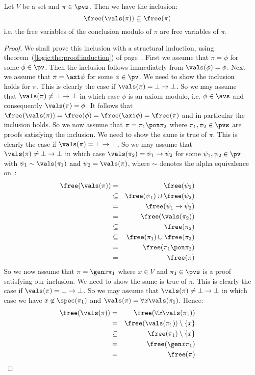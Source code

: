 \begin{prop}\label{logic:prop:FUAP:valuationmod:freevar:conclusion}
Let $V$ be a set and $\pi\in\pvs$. Then we have the inclusion:
    \[
    \free(\vals(\pi))\subseteq\free(\pi)
    \]
i.e. the free variables of the conclusion modulo of $\pi$ are free
variables of $\pi$.
\end{prop}
\begin{proof}
We shall prove this inclusion with a structural induction, using
theorem~(\ref{logic:the:proof:induction}) of
page~\pageref{logic:the:proof:induction}. First we assume that
$\pi=\phi$ for some $\phi\in\pv$. Then the inclusion follows
immediately from $\vals(\phi)=\phi$. Next we assume that
$\pi=\axi\phi$ for some $\phi\in\pv$. We need to show the inclusion
holds for $\pi$. This is clearly the case if
$\vals(\pi)=\bot\to\bot$. So we may assume that
$\vals(\pi)\neq\bot\to\bot$ in which case $\phi$ is an axiom modulo,
i.e. $\phi\in\avs$ and consequently $\vals(\pi)=\phi$. It follows
that $\free(\vals(\pi))=\free(\phi)=\free(\axi\phi)=\free(\pi)$ and
in particular the inclusion holds. So we now assume that
$\pi=\pi_{1}\pon\pi_{2}$ where $\pi_{1},\pi_{2}\in\pvs$ are proofs
satisfying the inclusion. We need to show the same is true of $\pi$.
This is clearly the case if $\vals(\pi)=\bot\to\bot$. So we may
assume that $\vals(\pi)\neq\bot\to\bot$ in which case
$\vals(\pi_{2})=\psi_{1}\to\psi_{2}$ for some
$\psi_{1},\psi_{2}\in\pv$ with $\psi_{1}\sim\vals(\pi_{1})$ and
$\psi_{2}=\vals(\pi)$, where $\sim$ denotes the alpha equivalence
on \pv\,:
    \begin{eqnarray*}
    \free(\vals(\pi))&=&\free(\psi_{2})\\
    &\subseteq&\free(\psi_{1})\cup\free(\psi_{2})\\
    &=&\free(\psi_{1}\to\psi_{2})\\
    &=&\free(\vals(\pi_{2}))\\
    &\subseteq&\free(\pi_{2})\\
    &\subseteq&\free(\pi_{1})\cup\free(\pi_{2})\\
    &=&\free(\pi_{1}\pon\pi_{2})\\
    &=&\free(\pi)
    \end{eqnarray*}
So we now assume that $\pi=\gen x\pi_{1}$ where $x\in V$ and
$\pi_{1}\in\pvs$ is a proof satisfying our inclusion. We need to
show the same is true of $\pi$. This is clearly the case if
$\vals(\pi)=\bot\to\bot$. So we may assume that
$\vals(\pi)\neq\bot\to\bot$ in which case we have
$x\not\in\spec(\pi_{1})$ and $\vals(\pi)=\forall x\vals(\pi_{1})$.
Hence:
    \begin{eqnarray*}
    \free(\vals(\pi))&=&\free(\forall x\vals(\pi_{1}))\\
    &=&\free(\vals(\pi_{1}))\setminus\{x\}\\
    &\subseteq&\free(\pi_{1})\setminus\{x\}\\
    &=&\free(\gen x\pi_{1})\\
    &=&\free(\pi)\\
    \end{eqnarray*}
\end{proof}

